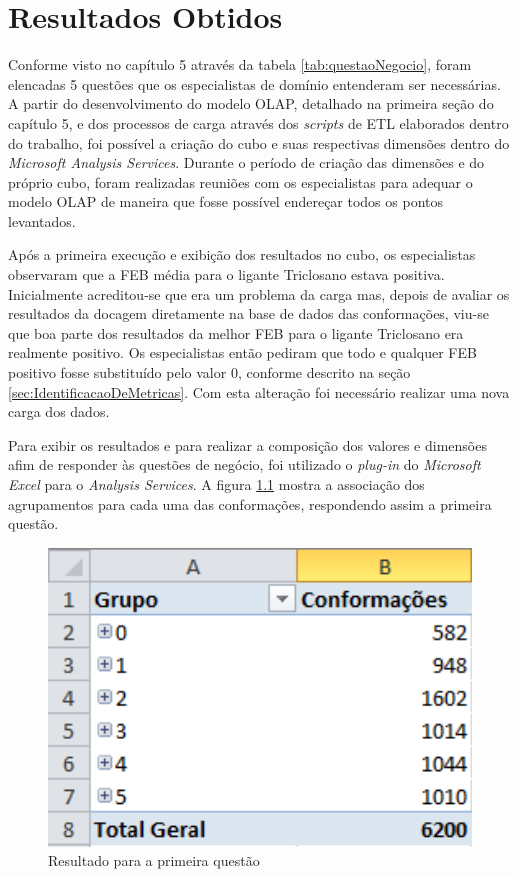 \chapter{Resultados Obtidos}

Conforme visto no capítulo 5 através da tabela \ref{tab:questaoNegocio}, foram elencadas 5 questões que os especialistas de domínio entenderam ser necessárias. A partir do desenvolvimento do modelo OLAP, detalhado na primeira seção do capítulo 5, e dos processos de carga através dos \emph{scripts} de ETL elaborados dentro do trabalho, foi possível a criação do cubo e suas respectivas dimensões dentro do \emph{Microsoft Analysis Services}. Durante o período de criação das dimensões e do próprio cubo, foram realizadas reuniões com os especialistas para adequar o modelo OLAP de maneira que fosse possível endereçar todos os pontos levantados. 

Após a primeira execução e exibição dos resultados no cubo, os especialistas observaram que a FEB média para o ligante Triclosano estava positiva. Inicialmente acreditou-se que era um problema da carga mas, depois de avaliar os resultados da docagem diretamente na base de dados das conformações, viu-se que boa parte dos resultados da melhor FEB para o ligante Triclosano era realmente positivo. Os especialistas então pediram que todo e qualquer FEB positivo fosse substituído pelo valor 0, conforme descrito na seção \ref{sec:IdentificacaoDeMetricas}. Com esta alteração foi necessário realizar uma nova carga dos dados.

Para exibir os resultados e para realizar a composição dos valores e dimensões afim de responder às questões de negócio, foi utilizado o \emph{plug-in} do \emph{Microsoft Excel} para o \emph{Analysis Services}. A figura \ref{fig:questao1} mostra a associação dos agrupamentos para cada uma das conformações, respondendo assim a primeira questão. 

\begin{figure}[h]
        \center
        \includegraphics[width=14cm]{images/Questao1.PNG}
        \caption{Resultado para a primeira questão}
        \label{fig:questao1}
\end{figure}

